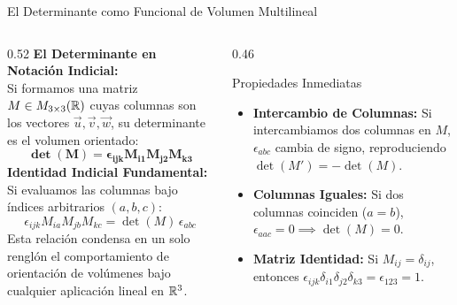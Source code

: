\documentclass[10pt,aspectratio=169]{beamer}
\begin{document}
\begin{frame}{El Determinante como Funcional de Volumen Multilineal}
  \begin{columns}[c]
    \begin{column}{0.52\textwidth}
      \footnotesize
      \textbf{El Determinante en Notación Indicial:}\\[2pt]
      Si formamos una matriz $M \in M_{3\times 3}(\mathbb{R})$ cuyas columnas son los vectores $\vec{u}, \vec{v}, \vec{w}$, su determinante es el volumen orientado:
      \[
      \mathbf{\det(M) = \epsilon_{ijk} M_{i1} M_{j2} M_{k3}}
      \]
      \textbf{Identidad Indicial Fundamental:}\\[2pt]
      Si evaluamos las columnas bajo índices arbitrarios $(a, b, c)$:
      \[
      \boxed{\epsilon_{ijk} M_{ia} M_{jb} M_{kc} = \det(M)\,\epsilon_{abc}}
      \]
      Esta relación condensa en un solo renglón el comportamiento de orientación de volúmenes bajo cualquier aplicación lineal en $\mathbb{R}^3$.
    \end{column}
    \begin{column}{0.46\textwidth}
      \begin{block}{Propiedades Inmediatas}
        \footnotesize
        \begin{itemize}
          \itemsep3pt
          \item \textbf{Intercambio de Columnas:} Si intercambiamos dos columnas en $M$, $\epsilon_{abc}$ cambia de signo, reproduciendo $\det(M') = -\det(M)$.
          \item \textbf{Columnas Iguales:} Si dos columnas coinciden ($a=b$), $\epsilon_{aac} = 0 \implies \det(M) = 0$.
          \item \textbf{Matriz Identidad:} Si $M_{ij} = \delta_{ij}$, entonces $\epsilon_{ijk}\delta_{i1}\delta_{j2}\delta_{k3} = \epsilon_{123} = 1$.
        \end{itemize}
      \end{block}
    \end{column}
  \end{columns}
\end{frame}
\end{document}
